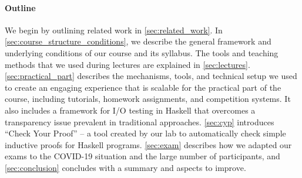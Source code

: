 \paragraph{Outline}

We begin by outlining related work in \cref{sec:related_work}.
In \cref{sec:course_structure_conditions},
we describe the general framework and underlying conditions of our course and its syllabus.
The tools and teaching methods that we used during lectures are explained in \cref{sec:lectures}.
\cref{sec:practical_part} describes the
mechanisms, tools, and technical setup
we used to create an engaging experience
that is scalable
for the practical part of the course,
including tutorials, homework assignments, and
competition systems.
It also includes a framework for I/O
testing in Haskell
that overcomes a transparency issue prevalent in traditional approaches.
\cref{sec:cyp} introduces
``Check Your Proof'' -- a tool created
by our lab to automatically check simple inductive proofs for Haskell programs.
\cref{sec:exam} describes how we adapted our exams to the COVID-19 situation and the large number of participants,
and \cref{sec:conclusion} concludes with a summary and aspects to improve.

